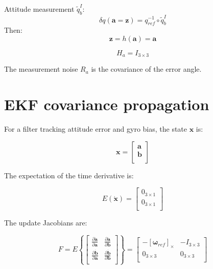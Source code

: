 \documentclass[a4paper]{paper}
\begin{document}
Attitude measurement $\tilde{q}_b^I$:
\begin{equation}
    \delta q(\bm{a}=\bm{z}) = q_{ref}^{-1} \circ \tilde{q}_b^I
    \label{eq:q_measurement_def}
\end{equation}
Then:
\begin{equation}
    \bm{z} = h(\bm{a}) = \bm{a}
    \label{eq:q_measurement_fn}
\end{equation}

\begin{equation}
    H_a = I_{3\times3}
    \label{eq:q_measurement_H}
\end{equation}

The measurement noise $R_a$ is the covariance of the error angle.

\section{EKF covariance propagation}

For a filter tracking attitude error and gyro bias, the state $\bm{x}$ is:

\begin{equation}
    \bm{x} = \left[
        \begin{matrix}
            \bm{a}\\[0.3em]
            \bm{b}\\
        \end{matrix}
        \right]
\end{equation}

The expectation of the time derivative is:

\begin{equation}
    E (\bm{\dot x}) = \left[
        \begin{matrix}
            0_{3\times1}\\[0.3em]
            0_{3\times1}\\
        \end{matrix}
        \right]
\end{equation}

The update Jacobians are:

\begin{equation}
    F = E \left\{
        \left[
        \begin{matrix}
            \frac{\partial \dot{\bm{a}}}{\partial \bm{a}} & \frac{\partial \dot{\bm{a}}}{\partial \bm{b}}\\[0.3em]
            \frac{\partial \dot{\bm{b}}}{\partial \bm{a}} & \frac{\partial \dot{\bm{b}}}{\partial \bm{b}}\\
        \end{matrix}
        \right]
    \right\}
    = \left[
        \begin{matrix}
            -{[\bm{\omega}_{ref}]}_\times & -I_{3\times3}\\[0.3em]
            0_{3\times3} & 0_{3\times3}\\
        \end{matrix}
        \right]
\end{equation}
\end{document}
